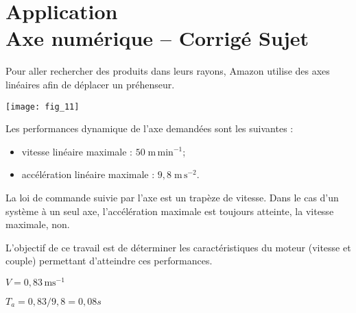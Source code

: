 \chapter*{Application  \\ 
Axe numérique -- \ifprof Corrigé \else Sujet \fi}


\iflivret {} \else
\ifprof  {} \else \fi
\fi
\setcounter{question}{0}

\marginnote{}
\marginnote{
}





Pour aller rechercher des produits dans leurs rayons, Amazon utilise des axes linéaires afin de déplacer un préhenseur.
\begin{marginfigure}
\texttt{[image: fig\_11]}
\end{marginfigure}

Les performances dynamique de l'axe demandées sont les suivantes : 
\begin{itemize}
\item vitesse linéaire maximale : $50 \; \text{m}\,\text{min}^{-1}$;
\item accélération linéaire maximale : $9,8 \; \text{m}\, \text{s}^{-2}$.
\end{itemize}

La loi de commande suivie par l'axe est un trapèze de vitesse. Dans le cas d'un système à un seul axe, l'accélération maximale est toujours atteinte, la vitesse maximale, non.

\begin{obj}
L'objectif de ce travail est de déterminer les caractéristiques du moteur (vitesse et couple) permettant d'atteindre ces performances.
\end{obj}

\ifprof
\begin{corrige}
$V = 0,83 \, \text{ms}^{-1}$
\end{corrige}
\else
\fi

\ifprof
\begin{corrige}
$T_a =0,83/9,8 = 0,08 s$
\end{corrige}
\else
\fi

